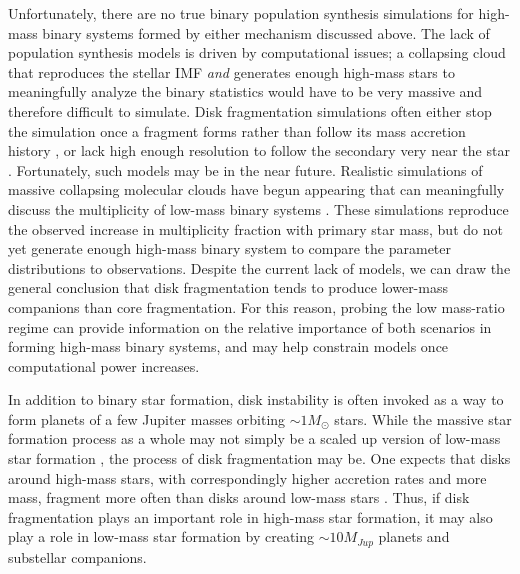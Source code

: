 Unfortunately, there are no true binary population synthesis
simulations for high-mass binary systems formed by either mechanism
discussed above. The lack of population synthesis models is driven
by computational issues; a collapsing
cloud that reproduces the stellar IMF \emph{and} generates
enough high-mass stars to meaningfully analyze the binary statistics
would have to be very massive and therefore difficult to
simulate. Disk fragmentation simulations often either stop the
simulation once a fragment forms rather than follow its mass accretion
history \citep[e.g.][]{Boss2011, Krumholz2007}, or lack high enough resolution to follow the secondary very
near the star \citep[e.g.][]{BonnellBate2005}. Fortunately, such models may be in the near future. Realistic simulations of massive collapsing molecular clouds have begun appearing that can meaningfully discuss the multiplicity of low-mass binary systems
\citep{Bate2012, Krumholz2012}. These simulations reproduce the observed increase in multiplicity fraction with primary star mass, but do not yet generate enough high-mass binary system to compare the parameter distributions to observations. Despite the current lack of models, we can draw the general conclusion that disk
fragmentation tends to produce lower-mass companions than core
fragmentation. For this reason, probing the low mass-ratio regime can
provide information on the relative importance of both scenarios in
forming high-mass binary systems, and may help constrain models once
computational power increases.

In addition to binary star formation, disk instability is often invoked as a way
to form planets of a few Jupiter masses orbiting $\sim 1 M_{\odot}$ stars.
While the massive star formation process as a
whole may not simply be a scaled up version of low-mass star
formation \citep{Zinnecker2007}, the process of disk fragmentation may
be. One expects that disks around high-mass stars, with correspondingly higher accretion rates
and more mass, fragment more often than disks around low-mass stars \citep{Boss2011, Boss2006,
  Sally2009, Kratter2006}. Thus, if disk fragmentation plays an important role
in high-mass star formation, it may also play a role in low-mass star
formation by creating $\sim 10M_{Jup}$ planets and substellar companions.



